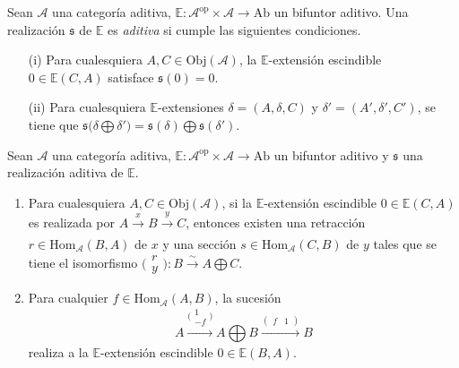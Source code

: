 \documentclass[tesis]{subfiles}
\begin{document}
\begin{Def}\cite[Definition 2.10]{NakaokaPalu}\label{NakaokaPalu-2.10}
    Sean $\mathscr{A}$ una categoría aditiva, $\mathbb{E}:\mathscr{A}^\text{op}\times\mathscr{A}\to \text{Ab}$ un bifuntor aditivo. Una realización $\mathfrak{s}$ de $\mathbb{E}$ es \emph{aditiva} si cumple las siguientes condiciones.
    \begin{itemize}
    
        \item[(i)] Para cualesquiera $A,C\in\text{Obj}(\mathscr{A})$, la $\mathbb{E}$-extensión escindible $0\in\mathbb{E}(C,A)$ satisface $\mathfrak{s}(0)=0$.

        \item[(ii)] Para cualesquiera $\mathbb{E}$-extensiones $\delta=(A,\delta,C)$ y $\delta'=(A',\delta',C')$, se tiene que $\mathfrak{s}\big(\delta\bigoplus\delta'\big) = \mathfrak{s}(\delta)\bigoplus\mathfrak{s}(\delta')$.
    \end{itemize}

\end{Def}

\begin{Obs}\cite[Remark 2.11]{NakaokaPalu}\label{NakaokaPalu-2.11}
    Sean $\mathscr{A}$ una categoría aditiva, $\mathbb{E}:\mathscr{A}^\text{op}\times\mathscr{A}\to \text{Ab}$ un bifuntor aditivo y $\mathfrak{s}$ una realización aditiva de $\mathbb{E}$.

    \begin{enumerate}[label=(\arabic*)]
    
        \item Para cualesquiera $A,C\in\text{Obj}(\mathscr{A})$, si la $\mathbb{E}$-extensión escindible $0\in\mathbb{E}(C,A)$ es realizada por $A\xrightarrow[]{x}B\xrightarrow[]{y}C$, entonces existen una retracción $r\in\text{Hom}_\mathscr{A}(B,A)$ de $x$ y una sección $s\in\text{Hom}_\mathscr{A}(C,B)$ de $y$ tales que se tiene el isomorfismo $\big(\begin{smallmatrix} r \\ y \end{smallmatrix}\big):B\xrightarrow[]{\sim}A\bigoplus C$.

        \item Para cualquier $f\in\text{Hom}_\mathscr{A}(A,B)$, la sucesión
            \[
                A \xrightarrow[]{\big( \begin{smallmatrix} 1 \\ -f \end{smallmatrix}\big)} A\bigoplus B \xrightarrow[]{(\begin{smallmatrix} f &1 \end{smallmatrix})} B
            \] 
            realiza a la $\mathbb{E}$-extensión escindible $0\in\mathbb{E}(B,A)$.
    \end{enumerate}
\end{Obs}
\end{document}
